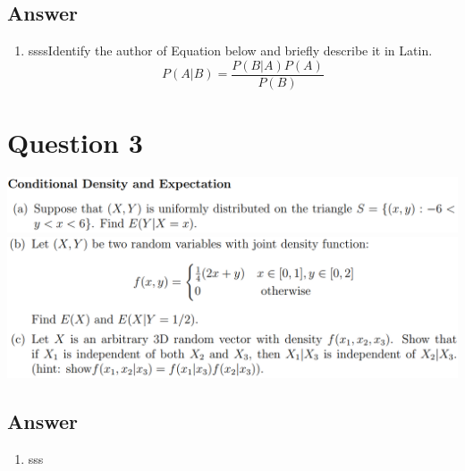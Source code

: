 \documentclass[
	12pt, %
]{fphw}
\begin{document}

\subsection*{Answer}
\begin{enumerate} %
	\item ssssIdentify the author of Equation below and briefly describe it in Latin.
	\begin{equation}\label{eq:bayes}
		P(A|B) = \frac{P(B|A)P(A)}{P(B)}
	\end{equation}
\end{enumerate}

\clearpage
\section*{Question 3}
\begin{problem}
    \includegraphics[width=440pt]{img/q3_1.png}\\
    \includegraphics[width=440pt]{img/q3_2.png}
\end{problem}


\subsection*{Answer} 
\begin{enumerate}
    \item sss 
\end{enumerate}

\clearpage
\end{document}
